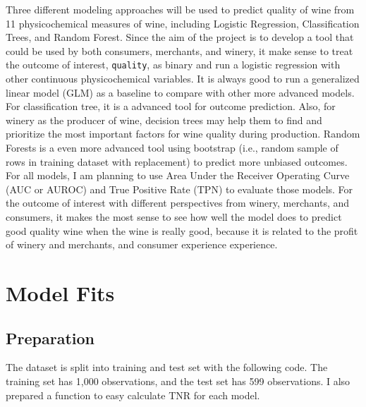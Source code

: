 \documentclass[
  english,
  man]{apa6}
\begin{document}
Three different modeling approaches will be used to predict quality of wine from 11 physicochemical measures of wine, including Logistic Regression, Classification Trees, and Random Forest.
Since the aim of the project is to develop a tool that could be used by both consumers, merchants, and winery, it make sense to treat the outcome of interest, \texttt{quality}, as binary and run a logistic regression with other continuous physicochemical variables. It is always good to run a generalized linear model (GLM) as a baseline to compare with other more advanced models.
For classification tree, it is a advanced tool for outcome prediction. Also, for winery as the producer of wine, decision trees may help them to find and prioritize the most important factors for wine quality during production.
Random Forests is a even more advanced tool using bootstrap (i.e., random sample of rows in training dataset with replacement) to predict more unbiased outcomes.\\
For all models, I am planning to use Area Under the Receiver Operating Curve (AUC or AUROC) and True Positive Rate (TPN) to evaluate those models. For the outcome of interest with different perspectives from winery, merchants, and consumers, it makes the most sense to see how well the model does to predict good quality wine when the wine is really good, because it is related to the profit of winery and merchants, and consumer experience experience.

\hypertarget{model-fits}{%
\section{Model Fits}\label{model-fits}}

\hypertarget{preparation}{%
\subsection{Preparation}\label{preparation}}

The dataset is split into training and test set with the following code. The training set has 1,000 observations, and the test set has 599 observations. I also prepared a function to easy calculate TNR for each model.
\end{document}
